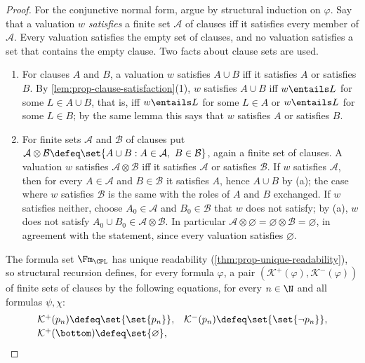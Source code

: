 \begin{proof}
For the conjunctive normal form, argue by structural induction on
\(\varphi\).  Say that a valuation \(w\) \emph{satisfies} a finite set
\(\mathcal A\) of clauses iff it satisfies every member of \(\mathcal A\).
Every valuation satisfies the empty set of clauses, and no valuation
satisfies a set that contains the empty clause.  Two facts about clause
sets are used.
\begin{enumerate}
  \item[(a)] For clauses \(A\) and \(B\), a valuation \(w\) satisfies
        \(A\cup B\) iff it satisfies \(A\) or satisfies \(B\).  By
        \cref{lem:prop-clause-satisfaction}(1), \(w\) satisfies \(A\cup B\)
        iff \(w\entails L\) for some \(L\in A\cup B\), that is, iff
        \(w\entails L\) for some \(L\in A\) or \(w\entails L\) for some
        \(L\in B\); by the same lemma this says that \(w\) satisfies \(A\)
        or satisfies \(B\).
  \item[(b)] For finite sets \(\mathcal A\) and \(\mathcal B\) of clauses
        put
        \(\mathcal A\otimes\mathcal B\defeq
        \set{A\cup B:A\in\mathcal A,\ B\in\mathcal B}\), again a finite set
        of clauses.  A valuation \(w\) satisfies \(\mathcal A\otimes\mathcal B\)
        iff it satisfies \(\mathcal A\) or satisfies \(\mathcal B\).  If
        \(w\) satisfies \(\mathcal A\), then for every \(A\in\mathcal A\)
        and \(B\in\mathcal B\) it satisfies \(A\), hence \(A\cup B\) by (a);
        the case where \(w\) satisfies \(\mathcal B\) is the same with the
        roles of \(A\) and \(B\) exchanged.  If \(w\) satisfies neither,
        choose \(A_0\in\mathcal A\) and \(B_0\in\mathcal B\) that \(w\) does
        not satisfy; by (a), \(w\) does not satisfy
        \(A_0\cup B_0\in\mathcal A\otimes\mathcal B\).  In particular
        \(\mathcal A\otimes\varnothing=\varnothing\otimes\mathcal B=\varnothing\),
        in agreement with the statement, since every valuation satisfies
        \(\varnothing\).
\end{enumerate}
The formula set \(\Fm_{\CPL}\) has unique readability
(\cref{thm:prop-unique-readability}), so structural recursion defines, for
every formula \(\varphi\), a pair
\((\mathcal K^{+}(\varphi),\mathcal K^{-}(\varphi))\) of finite sets of
clauses by the following equations, for every \(n\in\N\) and all formulas
\(\psi,\chi\):
\[
\begin{array}{lll}
 \mathcal K^{+}(p_n)\defeq\set{\set{p_n}},
 &\mathcal K^{-}(p_n)\defeq\set{\set{\neg p_n}},\\[2pt]
 \mathcal K^{+}(\bottom)\defeq\set{\varnothing},

\end{array}\]
\end{proof}
